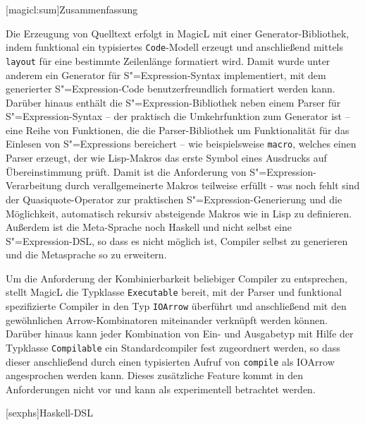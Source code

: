 \documentclass[12pt, a4paper, bibgerm]{scrbook}
\newcommand\icode[1]{\lstinline?#1?}
\newcommand\lchapter{}
\newcommand\lsection{}
\newcommand{\sexp}{S"=Expression}
\newcommand{\sexps}{S"=Expressions}
\begin{document}
\lsection[magicl:sum]{Zusammenfassung}

Die Erzeugung von Quelltext erfolgt in MagicL mit einer
Generator-Bibliothek, indem funktional ein typisiertes
\icode{Code}-Modell erzeugt und anschließend mittels \icode{layout} für
eine bestimmte Zeilenlänge formatiert wird. Damit wurde unter anderem
ein Generator für \sexp{}-Syntax implementiert, mit dem generierter
\sexp{}-Code benutzerfreundlich formatiert werden kann. Darüber hinaus
enthält die \sexp{}-Bibliothek neben einem Parser für \sexp{}-Syntax --
der praktisch die Umkehrfunktion zum Generator ist --
eine Reihe von Funktionen, die die Parser-Bibliothek um Funktionalität
für das Einlesen von \sexps{} bereichert -- wie beispielsweise
\icode{macro}, welches einen Parser erzeugt, der wie Lisp-Makros das
erste Symbol eines Ausdrucks auf Übereinstimmung prüft. Damit ist die
Anforderung von \sexp{}-Verarbeitung durch verallgemeinerte Makros
teilweise erfüllt - was noch fehlt sind der Quasiquote-Operator zur
praktischen \sexp{}-Generierung und die Möglichkeit, automatisch
rekursiv absteigende Makros wie in Lisp zu definieren. Außerdem ist die
Meta-Sprache noch Haskell und nicht selbst eine \sexp{}-DSL, so dass es
nicht möglich ist, Compiler selbst zu generieren und die Metasprache so
zu erweitern.

Um die Anforderung der Kombinierbarkeit beliebiger Compiler zu
entsprechen, stellt MagicL die Typklasse \icode{Executable} bereit, mit
der Parser und funktional spezifizierte Compiler in den Typ
\icode{IOArrow} überführt und anschließend mit den gewöhnlichen
Arrow-Kombinatoren miteinander verknüpft werden können. Darüber hinaus
kann jeder Kombination von Ein- und Ausgabetyp mit Hilfe der Typklasse
\icode{Compilable} ein Standardcompiler fest zugeordnert werden, so dass
dieser anschließend durch einen typisierten Aufruf von \icode{compile}
als IOArrow angesprochen werden kann. Dieses zusätzliche Feature kommt
in den Anforderungen nicht vor und kann als experimentell betrachtet
werden.

\lchapter[sexphs]{Haskell-DSL}
\end{document}
